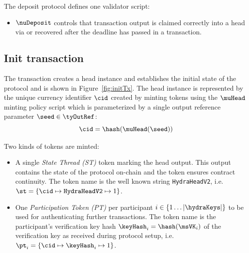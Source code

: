 \noindent The deposit protocol defines one validator script:
\begin{itemize}
	\item $\nuDeposit$ controls that \mtxDeposit{} transaction output is
	      claimed correctly into a head via \mtxIncrement{} or recovered after
	      the deadline has passed in a \mtxRecover{} transaction.
\end{itemize}

\subsection{Init transaction}\label{sec:init-tx}

The \mtxInit{} transaction creates a head instance and establishes the initial
state of the protocol and is shown in Figure~\ref{fig:initTx}. The head
instance is represented by the unique currency identifier $\cid$ created by
minting tokens using the $\muHead$ minting policy script which is parameterized
by a single output reference parameter $\seed \in \tyOutRef$:
\[
	\cid = \hash(\muHead(\seed))
\]


\noindent Two kinds of tokens are minted:
\begin{itemize}
	\item A single \emph{State Thread (ST)} token marking the head output. This
	      output contains the state of the protocol on-chain and the token ensures
	      contract continuity. The token name is the well known string
	      \texttt{HydraHeadV2}, i.e.
	      $\st = \{\cid \mapsto \texttt{HydraHeadV2} \mapsto 1\}$.
	\item One \emph{Participation Token (PT)} per participant
	      $i \in \{1 \dots |\hydraKeys|  \}$ to be used for authenticating further
	      transactions. The token name is the participant's verification key hash
	      $\keyHash_{i} = \hash(\msVK_{i})$ of the verification key as received
	      during protocol setup, i.e.
	      $\pt_{i} = \{\cid \mapsto \keyHash_{i} \mapsto 1\}$.
\end{itemize}

